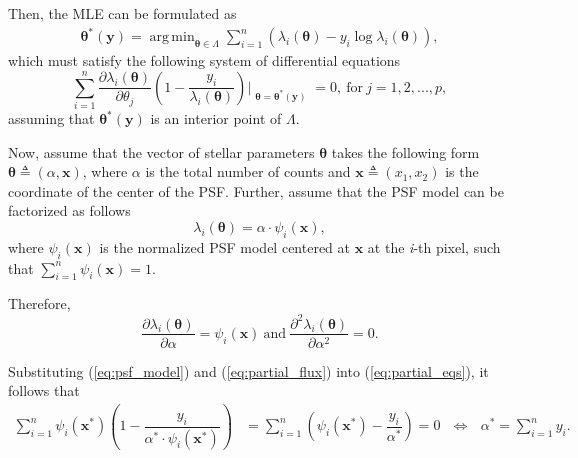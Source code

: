 \documentclass{rnaastex}
\DeclareMathOperator*{\argmin}{arg\,min}
\begin{document}
Then, the MLE can be formulated as
\begin{align}
    \bm{\theta}^{*}(\bm{y}) = \argmin_{\bm{\theta} \in \Lambda}
    \sum_{i=1}^{n}\left(\lambda_i(\bm{\theta}) - y_i\log\lambda_i(\bm{\theta})\right),
\end{align}
which must satisfy the following system of differential equations
\begin{equation}
    \sum_{i=1}^{n}\dfrac{\partial \lambda_i(\bm{\theta})}{\partial \theta_j}
    \left(1 - \dfrac{y_i}{\lambda_i(\bm{\theta})} \right)
    \Bigr|_{\substack{\bm{\theta}=\bm{\theta}^{*}(\bm{y})}} = 0,
    ~\mathrm{for}~j=1, 2, ..., p,
    \label{eq:partial_eqs}
\end{equation}
assuming that $\bm{\theta}^{*}(\bm{y})$ is an interior point of $\Lambda$.

Now, assume that the vector of stellar parameters $\bm{\theta}$ takes the
following form $\bm{\theta} \triangleq (\alpha, \bm{x})$, where $\alpha$
is the total number of counts and $\bm{x} \triangleq (x_1, x_2)$ is the
coordinate of the center of the PSF. Further, assume that the PSF model can be
factorized as follows
\begin{equation}
    \lambda_i(\bm{\theta}) = \alpha\cdot\psi_i(\bm{x}),
    \label{eq:psf_model}
\end{equation}
where $\psi_i(\bm{x})$ is the normalized PSF model centered at $\bm{x}$ at the
\textit{i}-th pixel, such that $\sum_{i=1}^{n}\psi_i(\bm{x})=1$.

Therefore,
\begin{equation}
    \dfrac{\partial{\lambda_i(\bm{\theta})}}{\partial \alpha} = \psi_i(\bm{x})~\text{and}~
    \dfrac{\partial^2{\lambda_i(\bm{\theta})}}{\partial \alpha^2} = 0.
    \label{eq:partial_flux}
\end{equation}

Substituting (\ref{eq:psf_model}) and (\ref{eq:partial_flux}) into
(\ref{eq:partial_eqs}), it follows that
\begin{align}
    \sum_{i=1}^{n} \psi_i(\bm{x}^{*})\left(1 - \dfrac{y_i}{\alpha^{*}
    \cdot\psi_i(\bm{x}^{*})} \right) &= \sum_{i=1}^{n} \left(\psi_i(\bm{x}^{*})
    -  \dfrac{y_i}{\alpha^{*}}\right) = 0~~~\Leftrightarrow~~~\alpha^{*} = \sum_{i=1}^{n} y_i.
    \label{eq:tada}
\end{align}
\end{document}
